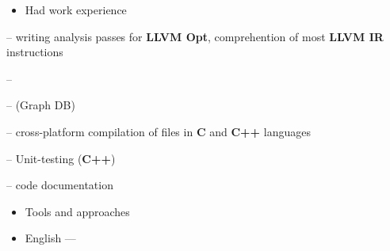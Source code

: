\documentclass[10pt,a4paper,ragged2e,withhyper]{custom-altacv}
\begin{document}
\begin{paracol}{2}
\divider

\begin{itemize}
	\item \textcolor{emphasis}{Had work experience} 
\end{itemize}

 -- writing analysis passes for \textbf{LLVM Opt}, comprehention of most \textbf{LLVM IR} instructions
\vspace{1ex}

 -- 
\vspace{1ex}

 --  (Graph DB)
\vspace{1ex}

 -- cross-platform compilation of files in \textbf{C} and \textbf{C++} languages
\vspace{1ex}

 -- Unit-testing (\textbf{C++})
\vspace{1ex}

 -- code documentation
\vspace{1ex}

\vspace{1ex}

\divider

\begin{itemize}
	\item\textcolor{emphasis}{Tools and approaches}
\end{itemize}





\begin{itemize}
	\item English --- 
\end{itemize}

\end{paracol}
\end{document}
